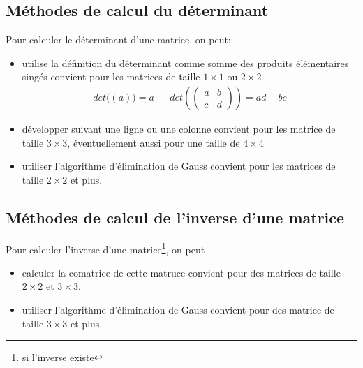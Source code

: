 %
\subsection{Méthodes de calcul du déterminant}
%
Pour calculer le déterminant d'une matrice, on peut:
\begin{itemize}
  \item utilise la définition du déterminant comme somme des produits élémentaires singés convient pour les matrices de taille $1 \times 1$ ou $2 \times 2$
    $$\begin{array}{lcr} det\big((a)\big) = a & & det\left(\begin{pmatrix} a & b \\ c & d \end{pmatrix}\right) = ad - bc \end{array}$$
  \item développer suivant une ligne ou une colonne convient pour les matrice de taille $3 \times 3$, éventuellement aussi pour une taille de $4 \times 4$
  \item utiliser l'algorithme d'élimination de Gauss convient pour les matrices de taille $2 \times 2$ et plus.
\end{itemize}

%
\subsection{Méthodes de calcul de l'inverse d'une matrice}
Pour calculer  l'inverse d'une matrice\footnote{si l'inverse existe}, on peut
\begin{itemize}
  \item calculer la comatrice de cette matruce convient pour des matrices de taille $2 \times 2$ et $3 \times 3$.
  \item utiliser l'algorithme d'élimination de Gauss convient pour des matrice de taille $3 \times 3$ et plus.
\end{itemize}
